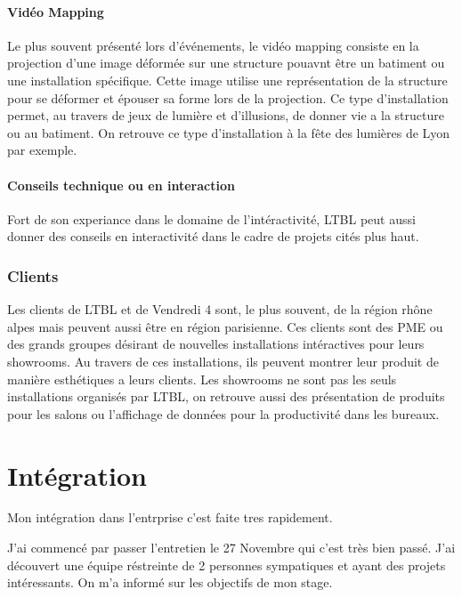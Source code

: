 \documentclass{article}
\begin{document}
\paragraph{Vidéo Mapping} Le plus souvent présenté lors d'événements, le vidéo mapping consiste en la projection d'une image déformée sur une structure pouavnt être un batiment ou une installation spécifique.
Cette image utilise une représentation de la structure pour se déformer et épouser sa forme lors de la projection.
Ce type d'installation permet, au travers de jeux de lumière et d'illusions, de donner vie a la structure ou au batiment.
On retrouve ce type d'installation à la fête des lumières de Lyon par exemple.

\paragraph{Conseils technique ou en interaction} Fort de son experiance dans le domaine de l'intéractivité, LTBL peut aussi donner des conseils en interactivité dans le cadre de projets cités plus haut.


\subsubsection{Clients}

Les clients de LTBL et de Vendredi 4 sont, le plus souvent, de la région rhône alpes mais peuvent aussi être en région parisienne.
Ces clients sont des PME ou des grands groupes désirant de nouvelles installations intéractives pour leurs showrooms.
Au travers de ces installations, ils peuvent montrer leur produit de manière esthétiques a leurs clients.
Les showrooms ne sont pas les seuls installations organisés par LTBL, on retrouve aussi des présentation de produits pour les salons ou l'affichage de données pour la productivité dans les bureaux.


\section{Intégration}

Mon intégration dans l'entrprise c'est faite tres rapidement.

J'ai commencé par passer l'entretien le 27 Novembre qui c'est très bien passé.
J'ai découvert une équipe réstreinte de 2 personnes sympatiques et ayant des projets intéressants.
On m'a informé sur les objectifs de mon stage.
\end{document}
